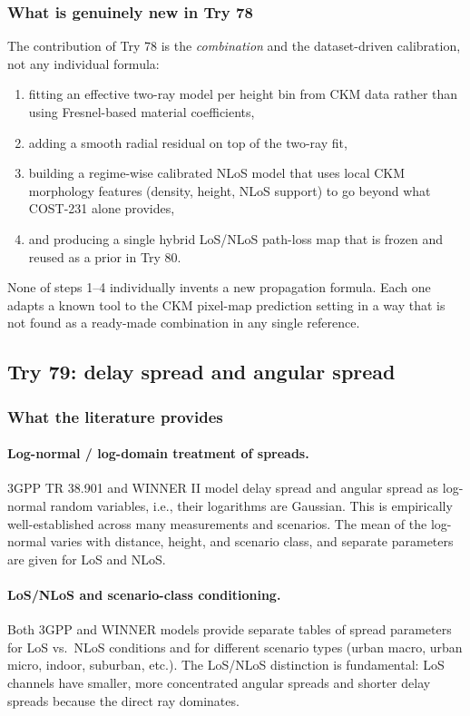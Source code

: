 \documentclass[11pt,a4paper]{article}
\begin{document}
\subsubsection{What is genuinely new in Try 78}

The contribution of Try 78 is the \emph{combination} and the dataset-driven
calibration, not any individual formula:

\begin{enumerate}
\item fitting an effective two-ray model per height bin from CKM data rather
      than using Fresnel-based material coefficients,
\item adding a smooth radial residual on top of the two-ray fit,
\item building a regime-wise calibrated NLoS model that uses local CKM
      morphology features (density, height, NLoS support) to go beyond what
      COST-231 alone provides,
\item and producing a single hybrid LoS/NLoS path-loss map that is frozen and
      reused as a prior in Try 80.
\end{enumerate}

None of steps 1--4 individually invents a new propagation formula. Each one
adapts a known tool to the CKM pixel-map prediction setting in a way that
is not found as a ready-made combination in any single reference.

\subsection{Try 79: delay spread and angular spread}

\subsubsection{What the literature provides}

\paragraph{Log-normal / log-domain treatment of spreads.}
3GPP TR 38.901 \cite{tr38901} and WINNER II \cite{winner2} model delay spread
and angular spread as log-normal random variables, i.e., their logarithms are
Gaussian. This is empirically well-established across many measurements and
scenarios. The mean of the log-normal varies with distance, height, and
scenario class, and separate parameters are given for LoS and NLoS.

\paragraph{LoS/NLoS and scenario-class conditioning.}
Both 3GPP and WINNER models provide separate tables of spread parameters for
LoS vs.\ NLoS conditions and for different scenario types (urban macro, urban
micro, indoor, suburban, etc.). The LoS/NLoS distinction is fundamental: LoS
channels have smaller, more concentrated angular spreads and shorter delay
spreads because the direct ray dominates.
\end{document}

